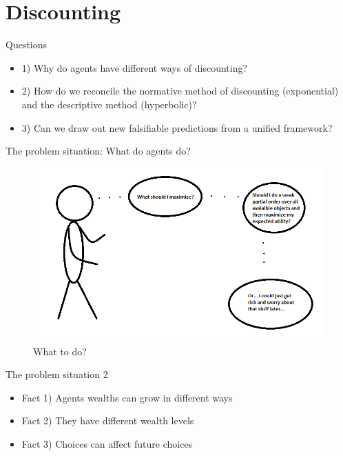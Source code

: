 \documentclass{beamer}
\newcommand{\flabel}[1]{\label{fig:#1}}
\numberwithin{equation}{section}
\begin{document}
\section{Discounting}
\begin{frame}{Questions}
\begin{itemize}
    \item 1) Why do agents have different ways of discounting?
    \item 2) How do we reconcile the normative method of discounting (exponential) and the descriptive method (hyperbolic)?
    \item 3) Can we draw out new falsifiable predictions from a unified framework? 
\end{itemize}
\end{frame}
\begin{frame}{The problem situation: What do agents do?}
\begin{figure}[!htb]
\centering
\includegraphics[width=1.0\textwidth]{./figures/maximize.PNG}
\caption{What to do?}
\flabel{caseA}
\end{figure}
\end{frame}
\begin{frame}{The problem situation 2}
\begin{itemize}
    \item Fact 1) Agents wealths can grow in different ways
    \item Fact 2) They have different wealth levels
    \item Fact 3) Choices can affect future choices
\end{itemize}
\end{frame}
\end{document}
